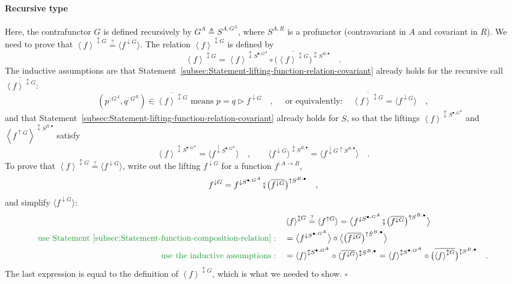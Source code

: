 \paragraph{Recursive type}

Here, the contrafunctor $G$ is defined recursively by $G^{A}\triangleq S^{A,G^{A}}$,
where $S^{A,R}$ is a profunctor (contravariant in $A$ and covariant
in $R$). We need to prove that $\left<f\right>^{\updownarrow G}\overset{?}{=}\langle f^{\downarrow G}\rangle$.
The relation $\left<f\right>^{\updownarrow G}$ is defined by
\[
\left<f\right>^{\updownarrow G}=\left<f\right>^{\updownarrow S^{\bullet,G^{A}}}\circ\big(\overline{\left<f\right>^{\updownarrow G}}\big)^{\updownarrow S^{B,\bullet}}\quad.
\]
The inductive assumptions are that Statement~\ref{subsec:Statement-lifting-function-relation-covariant}
already holds for the recursive call $\overline{\left<f\right>^{\updownarrow G}}$:
\[
(p^{:G^{A}},q^{:G^{B}})\in\overline{\left<f\right>^{\updownarrow G}}\text{ means }p=q\triangleright f^{\downarrow G}\quad,\quad\text{ or equivalently}:\quad\overline{\left<f\right>^{\updownarrow G}}=\langle f^{\downarrow G}\rangle\quad,
\]
and that Statement~\ref{subsec:Statement-lifting-function-relation-covariant}
already holds for $S$, so that the liftings $\left<f\right>^{\updownarrow S^{\bullet,G^{A}}}$
and $\left<f^{\uparrow G}\right>^{\updownarrow S^{B,\bullet}}$ satisfy
\[
\left<f\right>^{\updownarrow S^{\bullet,G^{A}}}=\langle f^{\downarrow S^{\bullet,G^{A}}}\rangle\quad,\quad\quad\langle f^{\downarrow G}\rangle^{\updownarrow S^{B,\bullet}}=\langle f^{\downarrow G\uparrow S^{B,\bullet}}\rangle\quad.
\]
To prove that $\left<f\right>^{\updownarrow G}\overset{?}{=}\langle f^{\downarrow G}\rangle$,
write out the lifting $f^{\downarrow G}$ for a function $f^{:A\rightarrow B}$,
\[
f^{\downarrow G}=f^{\downarrow S^{\bullet,G^{A}}}\bef\big(\overline{f^{\downarrow G}}\big)^{\uparrow S^{B,\bullet}}\quad,
\]
and simplify $\langle f^{\downarrow G}\rangle$:
\begin{align*}
 & \left<f\right>^{\updownarrow G}\overset{?}{=}\langle f^{\uparrow G}\rangle=\big\langle f^{\downarrow S^{\bullet,G^{A}}}\bef\big(\overline{f^{\downarrow G}}\big)^{\uparrow S^{B,\bullet}}\big\rangle\\
{\color{greenunder}\text{use Statement~\ref{subsec:Statement-function-composition-relation}}:}\quad & =\big\langle f^{\downarrow S^{\bullet,G^{A}}}\big\rangle\circ\big\langle\big(\overline{f^{\downarrow G}}\big)^{\uparrow S^{B,\bullet}}\big\rangle\\
{\color{greenunder}\text{use the inductive assumptions}:}\quad & =\left<f\right>^{\updownarrow S^{\bullet,G^{A}}}\circ\langle\overline{f^{\downarrow G}}\rangle^{\updownarrow S^{B,\bullet}}=\left<f\right>^{\updownarrow S^{\bullet,G^{A}}}\circ\big(\overline{\left<f\right>^{\updownarrow G}}\big)^{\updownarrow S^{B,\bullet}}\quad.
\end{align*}
The last expression is equal to the definition of $\left<f\right>^{\updownarrow G}$,
which is what we needed to show. $\square$

